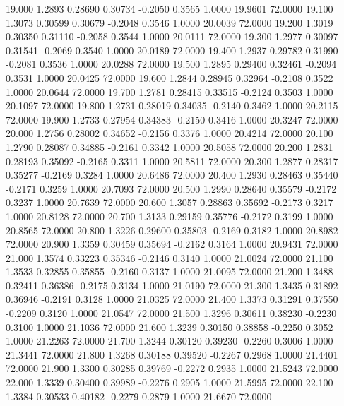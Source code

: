   19.000   1.2893   0.28690   0.30734  -0.2050   0.3565   1.0000  19.9601  72.0000
  19.100   1.3073   0.30599   0.30679  -0.2048   0.3546   1.0000  20.0039  72.0000
  19.200   1.3019   0.30350   0.31110  -0.2058   0.3544   1.0000  20.0111  72.0000
  19.300   1.2977   0.30097   0.31541  -0.2069   0.3540   1.0000  20.0189  72.0000
  19.400   1.2937   0.29782   0.31990  -0.2081   0.3536   1.0000  20.0288  72.0000
  19.500   1.2895   0.29400   0.32461  -0.2094   0.3531   1.0000  20.0425  72.0000
  19.600   1.2844   0.28945   0.32964  -0.2108   0.3522   1.0000  20.0644  72.0000
  19.700   1.2781   0.28415   0.33515  -0.2124   0.3503   1.0000  20.1097  72.0000
  19.800   1.2731   0.28019   0.34035  -0.2140   0.3462   1.0000  20.2115  72.0000
  19.900   1.2733   0.27954   0.34383  -0.2150   0.3416   1.0000  20.3247  72.0000
  20.000   1.2756   0.28002   0.34652  -0.2156   0.3376   1.0000  20.4214  72.0000
  20.100   1.2790   0.28087   0.34885  -0.2161   0.3342   1.0000  20.5058  72.0000
  20.200   1.2831   0.28193   0.35092  -0.2165   0.3311   1.0000  20.5811  72.0000
  20.300   1.2877   0.28317   0.35277  -0.2169   0.3284   1.0000  20.6486  72.0000
  20.400   1.2930   0.28463   0.35440  -0.2171   0.3259   1.0000  20.7093  72.0000
  20.500   1.2990   0.28640   0.35579  -0.2172   0.3237   1.0000  20.7639  72.0000
  20.600   1.3057   0.28863   0.35692  -0.2173   0.3217   1.0000  20.8128  72.0000
  20.700   1.3133   0.29159   0.35776  -0.2172   0.3199   1.0000  20.8565  72.0000
  20.800   1.3226   0.29600   0.35803  -0.2169   0.3182   1.0000  20.8982  72.0000
  20.900   1.3359   0.30459   0.35694  -0.2162   0.3164   1.0000  20.9431  72.0000
  21.000   1.3574   0.33223   0.35346  -0.2146   0.3140   1.0000  21.0024  72.0000
  21.100   1.3533   0.32855   0.35855  -0.2160   0.3137   1.0000  21.0095  72.0000
  21.200   1.3488   0.32411   0.36386  -0.2175   0.3134   1.0000  21.0190  72.0000
  21.300   1.3435   0.31892   0.36946  -0.2191   0.3128   1.0000  21.0325  72.0000
  21.400   1.3373   0.31291   0.37550  -0.2209   0.3120   1.0000  21.0547  72.0000
  21.500   1.3296   0.30611   0.38230  -0.2230   0.3100   1.0000  21.1036  72.0000
  21.600   1.3239   0.30150   0.38858  -0.2250   0.3052   1.0000  21.2263  72.0000
  21.700   1.3244   0.30120   0.39230  -0.2260   0.3006   1.0000  21.3441  72.0000
  21.800   1.3268   0.30188   0.39520  -0.2267   0.2968   1.0000  21.4401  72.0000
  21.900   1.3300   0.30285   0.39769  -0.2272   0.2935   1.0000  21.5243  72.0000
  22.000   1.3339   0.30400   0.39989  -0.2276   0.2905   1.0000  21.5995  72.0000
  22.100   1.3384   0.30533   0.40182  -0.2279   0.2879   1.0000  21.6670  72.0000
